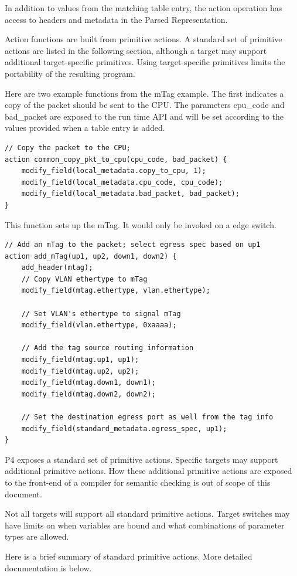 \documentclass[12pt]{article}
\begin{document}
In addition to values from the matching table entry, the action operation 
has access to headers and metadata in the Parsed Representation.

Action functions are built from primitive actions. A standard set of
primitive actions are listed in the following section, although a
target may support additional target-specific primitives. Using
target-specific primitives limits the portability of the resulting
program.

Here are two example functions from the mTag example.  The first indicates 
a copy of the packet should be sent to the CPU.  The parameters cpu_code 
and bad_packet are exposed to the run time API and will be set according 
to the values provided when a table entry is added.

\begin{lstlisting}[keywords={},frame=single,escapechar=\@]
// Copy the packet to the CPU;
action common_copy_pkt_to_cpu(cpu_code, bad_packet) {
    modify_field(local_metadata.copy_to_cpu, 1);
    modify_field(local_metadata.cpu_code, cpu_code);
    modify_field(local_metadata.bad_packet, bad_packet);
}
\end{lstlisting}


This function sets up the mTag. It would only be invoked on a edge switch.

\begin{lstlisting}[keywords={},frame=single,escapechar=\@]
// Add an mTag to the packet; select egress spec based on up1
action add_mTag(up1, up2, down1, down2) {
    add_header(mtag);
    // Copy VLAN ethertype to mTag
    modify_field(mtag.ethertype, vlan.ethertype);

    // Set VLAN's ethertype to signal mTag
    modify_field(vlan.ethertype, 0xaaaa);

    // Add the tag source routing information
    modify_field(mtag.up1, up1);
    modify_field(mtag.up2, up2);
    modify_field(mtag.down1, down1);
    modify_field(mtag.down2, down2);

    // Set the destination egress port as well from the tag info
    modify_field(standard_metadata.egress_spec, up1);
}
\end{lstlisting}



{\color{red} P4 exposes a standard set of primitive actions. Specific targets may support
additional primitive actions. How these additional primitive actions are exposed
to the front-end of a compiler for semantic checking is out of scope of this
document.

Not all targets will support all standard primitive actions. Target switches may
have limits on when variables are bound and what combinations of parameter types
are allowed.

Here is a brief summary of standard primitive actions. More detailed
documentation is below.}
\end{document}
